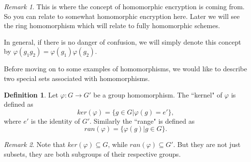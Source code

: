 \documentclass[12pt]{article}
\theoremstyle{plain}
\theoremstyle{definition}
\newtheorem{definition}{Definition}
\theoremstyle{remark}
\newtheorem{remark}{Remark}
\begin{document}
\begin{remark}
This is where the concept of homomorphic encryption is coming from. So you can relate to somewhat homomorphic encryption here. Later we will see the ring homomorphism which will relate to fully homomorphic schemes. 
\end{remark} 

In general, if there is no danger of confusion, we will simply denote this concept by 
$\varphi(g_1g_2) = \varphi(g_1)\varphi(g_2)$.

Before moving on to some examples of homomorphisms, we would like to describe two special sets associated with homomorphisms.
\begin{definition}
Let $\varphi:G\rightarrow G'$ be a group homomorphism.
The ``kernel" of $\varphi$ is defined as
$$ker(\varphi) = \{g\in G|\varphi(g)=e'\},$$
where $e'$ is the identity of $G'$.
Similarly the ``range" is defined as 
$$ran(\varphi) = \{\varphi(g)|g\in G\}.$$
\end{definition}
\begin{remark}
Note that $ker(\varphi) \subseteq G$, while $ran(\varphi) \subseteq G'$. But they are not just subsets, they are both subgroups of their respective groups. 
\end{remark}
\end{document}

